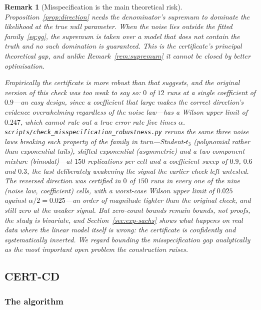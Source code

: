 \documentclass[pdflatex,sn-apa]{sn-jnl}
\theoremstyle{thmstyleone}%
\theoremstyle{thmstyletwo}%
\newtheorem{remark}{Remark}%
\theoremstyle{thmstylethree}%
\begin{document}
\begin{remark}[Misspecification is the main theoretical risk]
\label{rem:misspec}
Proposition~\ref{prop:direction} needs the denominator's supremum to dominate
the likelihood at the true null parameter. When the noise lies outside the
fitted family~\eqref{eq:gg}, the supremum is taken over a model that does not
contain the truth and no such domination is guaranteed. This is the
certificate's principal theoretical gap, and unlike Remark~\ref{rem:supremum}
it cannot be closed by better optimisation.

Empirically the certificate is more robust than that suggests, and the
original version of this check was too weak to say so: $0$ of $12$ runs at a
single coefficient of $0.9$---an easy design, since a coefficient that large
makes the correct direction's evidence overwhelming regardless of the noise
law---has a Wilson upper limit of $0.247$, which cannot rule out a true
error rate five times $\alpha$.
\texttt{scripts/check\_misspecification\_robustness.py} reruns the same three
noise laws breaking each property of the family in turn---Student-$t_3$
(polynomial rather than exponential tails), shifted exponential (asymmetric)
and a two-component mixture (bimodal)---at $150$ replications per cell and a
coefficient sweep of $0.9$, $0.6$ and $0.3$, the last deliberately weakening
the signal the earlier check left untested. The reversed direction was
certified in $0$ of $150$ runs in every one of the nine (noise law,
coefficient) cells, with a worst-case Wilson upper limit of $0.025$ against
$\alpha/2 = 0.025$---an order of magnitude tighter than the original check,
and still zero at the weaker signal. But zero-count bounds remain bounds, not
proofs, the study is bivariate, and Section~\ref{sec:exp-sachs} shows what
happens on real data where the linear model itself is wrong: the certificate
is confidently and systematically inverted. We regard bounding the
misspecification gap analytically as the most important open problem the
construction raises.
\end{remark}

\subsection{CERT-CD}\label{sec:algorithm}

\subsubsection{The algorithm}\label{sec:algo-desc}
\end{document}
